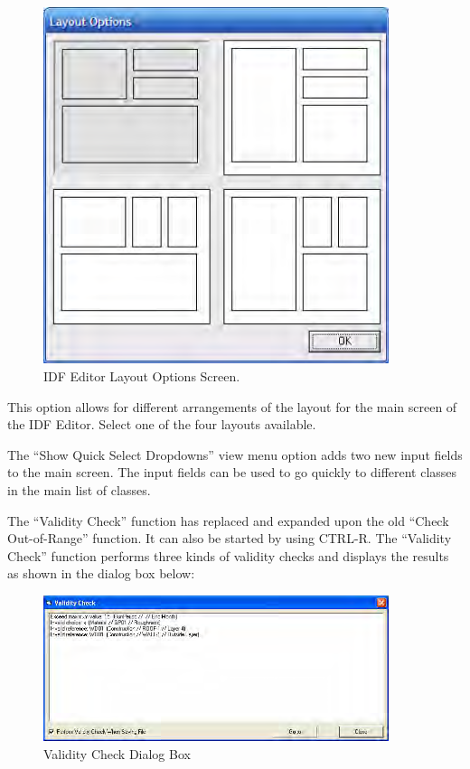 \begin{figure}[hbtp] %
\centering
\includegraphics[width=0.9\textwidth, height=0.9\textheight, keepaspectratio=true]{media/image120.png}
\caption{IDF Editor Layout Options Screen. \protect \label{fig:idf-editor-layout-options-screen.}}
\end{figure}

This option allows for different arrangements of the layout for the main screen of the IDF Editor. Select one of the four layouts available.

The ``Show Quick Select Dropdowns'' view menu option adds two new input fields to the main screen. The input fields can be used to go quickly to different classes in the main list of classes.

The ``Validity Check'' function has replaced and expanded upon the old ``Check Out-of-Range'' function. It can also be started by using CTRL-R. The ``Validity Check'' function performs three kinds of validity checks and displays the results as shown in the dialog box below:

\begin{figure}[hbtp] %
\centering
\includegraphics[width=0.9\textwidth, height=0.9\textheight, keepaspectratio=true]{media/image121.png}
\caption{Validity Check Dialog Box \protect \label{fig:validity-check-dialog-box}}
\end{figure}

